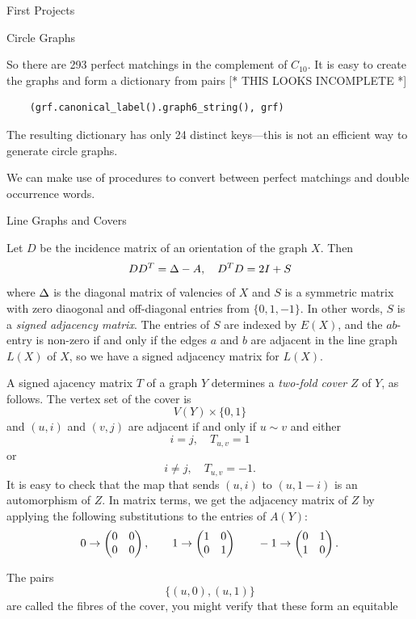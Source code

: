\begin{chap}{First Projects}
\begin{sect}{Circle Graphs}
\begin{sagecode}
\end{sagecode}
%
\begin{para}
So there are 293 perfect matchings in the complement of $C_{10}$. It is easy
to create the graphs and form a dictionary from pairs  [* THIS LOOKS INCOMPLETE *]
\end{para}
%
\begin{verbatim}
    (grf.canonical_label().graph6_string(), grf)
\end{verbatim}
%
\begin{para}
The resulting dictionary has only 24 distinct keys---this is not an efficient
way to generate circle graphs.
\end{para}
%
\begin{para}
We can make use of procedures to convert between perfect matchings and double
occurrence words.
\end{para}
%
\end{sect}
%
\begin{sect}{Line Graphs and Covers}
%
\begin{para}
Let $D$ be the incidence matrix of an orientation of the graph $X$. Then
\[
    DD^T = \Delta -A,\quad D^TD = 2I +S
\]
where $\Delta$ is the diagonal matrix of valencies of $X$ and $S$ is a symmetric
matrix with zero diaogonal and off-diagonal entries from $\{0,1,-1\}$.
In other words, $S$ is a \textsl{signed adjacency matrix}. The entries of
$S$ are indexed by $E(X)$, and the $ab$-entry is non-zero if and only if
the edges $a$ and $b$ are adjacent in the line graph $L(X)$ of $X$,
so we have a signed adjacency matrix for $L(X)$.
\end{para}
%
\begin{para}
A signed ajacency matrix $T$ of a graph $Y$ determines a \textsl{two-fold cover} $Z$
of $Y$, as follows. The vertex set of the cover is
\[
    V(Y) \times \{0,1\}
\]
and $(u,i)$ and $(v,j)$ are adjacent if and only if $u\sim v$ and either
\[
    i=j,\quad T_{u,v}=1
\]
or
\[
    i\ne j,\quad T_{u,v}=-1.
\]
It is easy to check that the map that sends $(u,i)$ to $(u,1-i)$ is an automorphism
of $Z$. In matrix terms, we get the adjacency matrix of $Z$ by applying
the following substitutions to the entries of $A(Y)$:
\[
    0\to\begin{pmatrix} 0&0\\0&0 \end{pmatrix},\qquad 1\to\begin{pmatrix} 1&0\\0&1 \end{pmatrix}
        \qquad -1\to\begin{pmatrix} 0&1\\1&0 \end{pmatrix}.
\]
\end{para}
%
\begin{para}
The pairs 
\[
    \{(u,0),(u,1)\}
\]
are called the fibres of the cover, you might verify that these form an equitable

\end{para}
\end{sect}
\end{chap}
